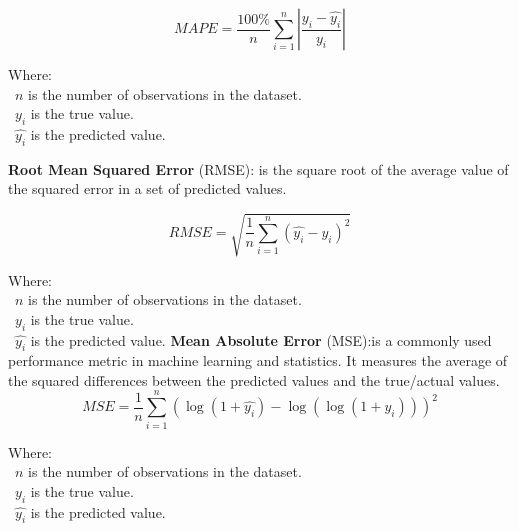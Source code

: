 \documentclass{ieeeojies}
\begin{document}
\[
  MAPE = \frac{100\%}{n} \sum_{i=1}^{n} \left| \frac{y_i - \hat{y_i}}{y_i} \right|
\]

Where: \\
\indent \textbullet\ \( n \) is the number of observations in the dataset. \\
\indent \textbullet\ \( y_i \) is the true value. \\
\indent \textbullet\ \( \hat{y_i} \) is the predicted value.

\textbf{Root Mean Squared Error} (RMSE): is the square root of the average value of the squared error in a set of predicted values.

\[
  RMSE = \sqrt{\frac{1}{n} \sum_{i=1}^{n} (\hat{y_i} - y_i)^2}
\]

Where: \\
\indent \textbullet\ \( n \) is the number of observations in the dataset. \\
\indent \textbullet\ \( y_i \) is the true value. \\
\indent \textbullet\ \( \hat{y_i} \) is the predicted value.
\textbf{Mean Absolute Error} (MSE):is a commonly used performance metric in machine learning and statistics. It measures the average of the squared differences
between the predicted values and the true/actual values.\\
\[
  MSE = \frac{1}{n} \sum_{i=1}^{n} \left( \log(1 + \hat{y_i}) - \log(\log(1 + y_i)) \right)^2
\]

Where: \\
\indent \textbullet\ \( n \) is the number of observations in the dataset. \\
\indent \textbullet\ \( y_i \) is the true value. \\
\indent \textbullet\ \( \hat{y_i} \) is the predicted value.
\vspace{-3mm}
\end{document}
